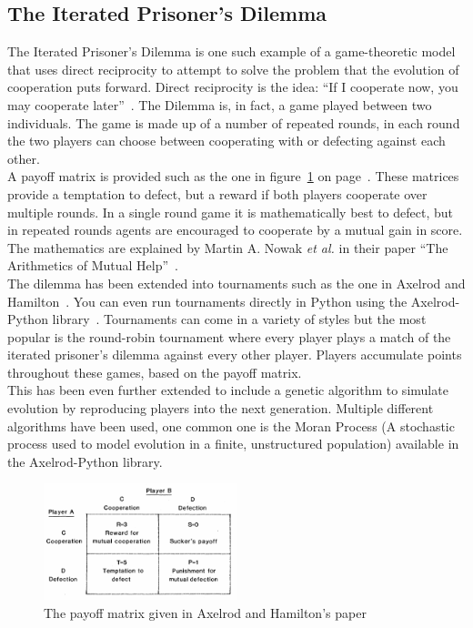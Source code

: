 \documentclass[twoside,twocolumn]{article}
\begin{document}
\subsection{The Iterated Prisoner's Dilemma}
The Iterated Prisoner's Dilemma is one such example of a game-theoretic model that uses direct reciprocity to attempt to solve the problem that the evolution of cooperation puts forward. Direct reciprocity is the idea: ``If I cooperate now, you may cooperate later''~\cite{five_rules_coop}. The Dilemma is, in fact, a game played between two individuals. The game is made up of a number of repeated rounds, in each round the two players can choose between cooperating with or defecting against each other.\\
A payoff matrix is provided such as the one in figure~\ref{fig:payoffmatrix} on page~\pageref{fig:payoffmatrix}. These matrices provide a temptation to defect, but a reward if both players cooperate over multiple rounds. In a single round game it is mathematically best to defect, but in repeated rounds agents are encouraged to cooperate by a mutual gain in score. The mathematics are explained by Martin A. Nowak \textit{et al.} in their paper ``The Arithmetics of Mutual Help''~\cite{arithmetics_of_mutual_help}.\\
The dilemma has been extended into tournaments such as the one in Axelrod and Hamilton~\cite{evolution_of_cooperation}. You can even run tournaments directly in Python using the Axelrod-Python library~\cite{axelrodproject}. Tournaments can come in a variety of styles but the most popular is the round-robin tournament where every player plays a match of the iterated prisoner's dilemma against every other player. Players accumulate points throughout these games, based on the payoff matrix.\\
This has been even further extended to include a genetic algorithm to simulate evolution by reproducing players into the next generation. Multiple different algorithms have been used, one common one is the Moran Process (A stochastic process used to model evolution in a finite, unstructured population) available in the Axelrod-Python library. 
\begin{figure}
	\includegraphics[width=0.5\textwidth]{payoffmatrix.png}
	\caption{The payoff matrix given in Axelrod and Hamilton's paper~\cite{evolution_of_cooperation}}
	\label{fig:payoffmatrix}
\end{figure}
\end{document}
